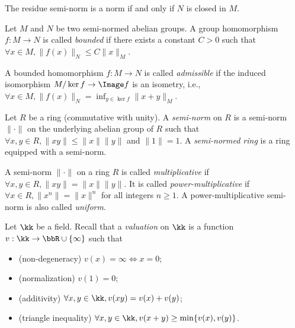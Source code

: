     \begin{remark}\label{rmk:residue_semi-norm}
        The residue semi-norm is a norm if and only if \(N\) is closed in \(M\).
    \end{remark}

    \begin{definition}\label{def:bounded_and_admissible_homomorphism}
        Let \(M\) and \(N\) be two semi-normed abelian groups.
        A group homomorphism \(f: M \to N\) is called \emph{bounded} if there exists a constant \(C > 0\) such that \(\forall x \in M, \|f(x)\|_N \leq C\|x\|_M\).
        
        A bounded homomorphism \(f: M \to N\) is called \emph{admissible} if the induced isomorphism \(M/\ker f \to \Image f\) is an isometry, i.e., \(\forall x \in M, \|f(x)\|_N = \inf_{y \in \ker f} \|x + y\|_M\).
    \end{definition}

    \begin{definition}\label{def:semi-normed_rings}
        Let \(R\) be a ring (commutative with unity).
        A \emph{semi-norm} on \(R\) is a semi-norm \(\|\cdot\|\) on the underlying abelian group of \(R\) such that \(\forall x,y \in R, \|xy\| \leq \|x\|\|y\|\) and \(\|1\| = 1\).
        A \emph{semi-normed ring} is a ring equipped with a semi-norm.
    \end{definition}

    \begin{definition}\label{def:multiplicative_and_power_multiplicative_semi-norm}
        A semi-norm \(\|\cdot\|\) on a ring \(R\) is called \emph{multiplicative} if \(\forall x,y \in R, \|xy\| = \|x\|\|y\|\).
        It is called \emph{power-multiplicative} if \(\forall x \in R, \|x^n\| = \|x\|^n\) for all integers \(n \geq 1\).
        A power-multiplicative semi-norm is also called \emph{uniform}.
    \end{definition}

    \begin{remark}\label{rmk:additive_and_multiplicative_valuation_on_a_field}
        Let \(\kk\) be a field.
        Recall that a \emph{valuation} on \(\kk\) is a function \(v: \kk \to \bbR \cup \{\infty\}\) such that
        \begin{itemize}
            \item (non-degeneracy) \(v(x) = \infty \iff x = 0\);
            \item (normalization) \(v(1) = 0\);
            \item (additivity) \(\forall x,y \in \kk, v(xy) = v(x) + v(y)\);
            \item (triangle inequality) \(\forall x,y \in \kk, v(x + y) \geq \min\{v(x), v(y)\}\).
        \end{itemize}
    \end{remark}

